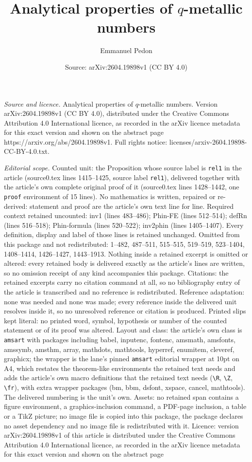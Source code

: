 \documentclass[10pt,a4paper]{amsart}
\title[Analytical properties of $q$-metallic numbers]{Analytical properties of $q$-metallic numbers}
\author{Emmanuel Pedon}
\date{Source: arXiv:2604.19898v1 (CC BY 4.0)}
\begin{document}
\maketitle

\noindent\emph{Source and licence.} Analytical properties of $q$-metallic numbers. Version arXiv:2604.19898v1 (CC BY 4.0), distributed under the Creative Commons Attribution 4.0 International licence, as recorded in the arXiv licence metadata for this exact version and shown on the abstract page https://arxiv.org/abs/2604.19898v1. Full rights notice: licenses/arxiv-2604.19898-CC-BY-4.0.txt.\par\smallskip

\noindent\textit{Editorial scope.} Counted unit: the Proposition whose source label is \texttt{rel1} in the article (source0.tex lines 1415--1425, source label \texttt{rel1}), delivered together with the article's own complete original proof of it (source0.tex lines 1428--1442, one \texttt{proof} environment of 15 lines). No mathematics is written, repaired or re-derived: statement and proof are the article's own text line for line. Required context retained uncounted: inv1 (lines 483--486); Phin-FE (lines 512--514); defRn (lines 516--518); Phin-formula (lines 520--522); inv2phin (lines 1405--1407). Every definition, display and label of those lines is retained unchanged. Omitted from this package and not redistributed: 1--482, 487--511, 515--515, 519--519, 523--1404, 1408--1414, 1426--1427, 1443--1913. Nothing inside a retained excerpt is omitted or altered: every retained body is delivered exactly as the article's lines are written, so no omission receipt of any kind accompanies this package. Citations: the retained excerpts carry no citation command at all, so no bibliography entry of the article is transcribed and no reference is redistributed. Reference adaptation: none was needed and none was made; every reference inside the delivered unit resolves inside it, so no unresolved reference or citation is produced. Printed slips kept literal: no printed word, symbol, hypothesis or number of the counted statement or of its proof was altered. Layout and class: the article's own class is \texttt{amsart} with packages including babel, inputenc, fontenc, amsmath, amsfonts, amssymb, amsthm, array, mathdots, mathtools, hyperref, enumitem, cleveref, graphicx; the wrapper is the lane's pinned \texttt{amsart} editorial wrapper at 10pt on A4, which restates the theorem-like environments the retained text needs and adds the article's own macro definitions that the retained text needs (\texttt{\textbackslash R}, \texttt{\textbackslash Z}, \texttt{\textbackslash fr}), with extra wrapper packages (bm, bbm, dsfont, xspace, cancel, mathtools). The delivered numbering is the unit's own. Assets: no retained span contains a figure environment, a graphics-inclusion command, a PDF-page inclusion, a table or a TikZ picture; no image file is copied into this package, the package declares no asset dependency and no image file is redistributed with it. Licence: version arXiv:2604.19898v1 of this article is distributed under the Creative Commons Attribution 4.0 International licence, as recorded in the arXiv licence metadata for this exact version and shown on the abstract page 
\end{document}
